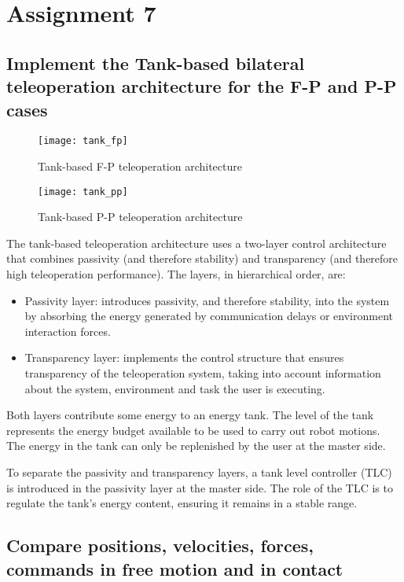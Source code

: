 \section{Assignment 7}

\subsection{Implement the Tank-based bilateral teleoperation architecture for the F-P and P-P cases}

\begin{figure}[h]
\centering
\texttt{[image: tank\_fp]}
\caption{Tank-based F-P teleoperation architecture}
\end{figure}

\begin{figure}[h]
\centering
\texttt{[image: tank\_pp]}
\caption{Tank-based P-P teleoperation architecture}
\end{figure}

The tank-based teleoperation architecture uses a two-layer control architecture that combines passivity (and therefore stability) and transparency (and therefore high teleoperation performance). The layers, in hierarchical order, are:

\begin{itemize}
\item Passivity layer: introduces passivity, and therefore stability, into the system by absorbing the energy generated by communication delays or environment interaction forces.
\item Transparency layer: implements the control structure that ensures transparency of the teleoperation system, taking into account information about the system, environment and task the user is executing.
\end{itemize}

Both layers contribute some energy to an energy tank. The level of the tank represents the energy budget available to be used to carry out robot motions. The energy in the tank can only be replenished by the user at the master side.

To separate the passivity and transparency layers, a tank level controller (TLC) is introduced in the passivity layer at the master side. The role of the TLC is to regulate the tank's energy content,  ensuring it remains in a stable range. 

\subsection{Compare positions, velocities, forces, commands in free motion and in contact}

